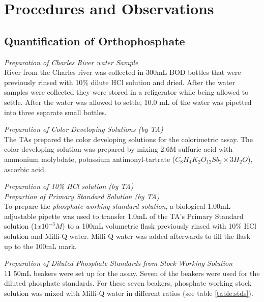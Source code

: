 \documentclass[]{article}   %
\begin{document}
\section{Procedures and Observations}
\subsection{Quantification of Orthophosphate}

\emph{Preparation of Charles River water Sample}\\
River from the Charles river was collected in 300mL BOD bottles that were previously rinsed with 10\% dilute HCl solution and dried. After the water samples were collected they were stored in a refigerator while being allowed to settle. After the water was allowed to settle, 10.0 mL of the water was pipetted into three separate small bottles.

\emph{Preparation of Color Developing Solutions (by TA)} \\
The TAs prepared the color developing solutions for the colorimetric assay. The color developing solution was prepared by mixing 2.6M sulfuric acid with ammonium molybdate, potassium antimonyl-tartrate ($C_8H_4K_2O_12Sb_2 \times 3 H_2O$), ascorbic acid. 

\emph{Preparation of 10\% HCl solution (by TA)}\\

\emph{Prepartion of Primary Standard Solution (by TA)}\\


To prepare the \emph{phosphate working standard solution}, a biological 1.00mL adjustable pipette was used to transfer 1.0mL of the TA's Primary Standard solution ($1x10^{-3}M$) to a 100mL volumetric flask previously rinsed with 10\% HCl solution and Milli-Q water. Milli-Q water was added afterwards to fill the flask up to the 100mL mark.


\emph{Preparation of Diluted Phosphate Standards from Stock Working Solution}\\
11 50mL beakers were set up for the assay. Seven of the beakers were used for the diluted phosphate standards. For these seven beakers, phosphate working stock solution was mixed with Milli-Q water in different ratios (see table \ref{table:stds}).
\end{document}
